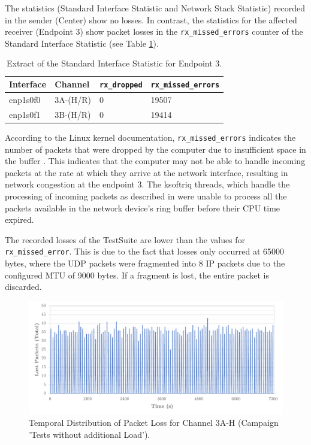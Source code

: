The statistics (Standard Interface Statistic and Network Stack Statistic) recorded in the sender (Center) show no losses. In contrast, the statistics for the affected receiver (Endpoint 3) show packet losses in the \texttt{rx\_missed\_errors} counter of the Standard Interface Statistic (see Table \ref{tab:ep3InterfaceStat}).

\begin{table}[h]
\centering
\begin{tabular}{llll}
	\toprule
	Interface & Channel & \texttt{rx\_dropped} & \texttt{rx\_missed\_errors} \\
	\midrule
 	enp1s0f0 & 3A-(H/R) & 0 & 19507 \\ 
 	enp1s0f1 & 3B-(H/R) & 0 & 19414 \\
	\bottomrule
\end{tabular}
\caption{Extract of the Standard Interface Statistic for Endpoint 3.}
\label{tab:ep3InterfaceStat}
\end{table}

According to the Linux kernel documentation, \texttt{rx\_missed\_errors} indicates the number of packets that were dropped by the computer due to insufficient space in the buffer \cite{sock11}. This indicates that the computer may not be able to handle incoming packets at the rate at which they arrive at the network interface, resulting in network congestion at the endpoint 3. The ksoftriq threads, which handle the processing of incoming packets as described in \label{chap:recpath} were unable to process all the packets available in the network device's ring buffer before their CPU time expired.

The recorded losses of the TestSuite are lower than the values for \texttt{rx\_missed\_error}. This is due to the fact that losses only occurred at 65000 bytes, where the UDP packets were fragmented into 8 IP packets due to the configured MTU of 9000 bytes. If a fragment is lost, the entire packet is discarded.

\begin{figure}[h!]
    \centering
    \includegraphics[width=1\linewidth]{figures/reliability/ihawk/diagr6.pdf}
    \caption{Temporal Distribution of Packet Loss for Channel 3A-H (Campaign 'Tests without additional Load').}
    \label{fig:diagr6Temp}
\end{figure}

